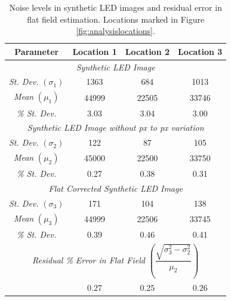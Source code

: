 \documentclass[11pt,a4paper]{article}
\begin{document}
	\begin{table}
		\centering
		\begin{tabular}{|c|c|c|c|}
			\hline
			\textbf{Parameter} &\textbf{ Location 1 }&\textbf{ Location 2} & \textbf{Location 3} \\ 
			\hline
			\hline 
			\multicolumn{4}{|c|}{\textit{Synthetic LED Image}} \\ 
			\hline
			\hline 
			\textit{St. Dev.} $(\sigma_1)$ &1363  & 684 & 1013 \\ 
			\hline 
			\textit{Mean }$(\mu_1)$& 44999 & 22505 & 33746 \\ 
			\hline 
			\textit{\% St. Dev.} &3.03  & 3.04 & 3.00 \\ 
			\hline 
			\hline
			\multicolumn{4}{|c|}{\textit{Synthetic LED Image without px to px variation}} \\ 
			\hline
			\hline 
			\textit{St. Dev.} $(\sigma_2)$&122  & 87 & 105 \\ 
			\hline 
			\textit{Mean} $(\mu_2)$& 45000 & 22500 & 33750 \\ 
			\hline 
			\textit{\% St. Dev.}& 0.27 & 0.38 & 0.31 \\ 
			\hline 
			\hline
			\multicolumn{4}{|c|}{\textit{Flat Corrected Synthetic LED Image}} \\ 
			\hline
			\hline 
			\textit{St. Dev. }$(\sigma_3)$& 171 & 104 & 138 \\ 
			\hline 
			\textit{Mean} $(\mu_3)$& 44999 & 22506 & 33745 \\ 
			\hline 
			\textit{\% St. Dev.}& 0.39 & 0.46 & 0.41 \\ 
			\hline 
			\hline
			\multicolumn{4}{|c|}{\textit{Residual \% Error in Flat Field} $\left(\dfrac{\sqrt{\sigma_3^2-\sigma_2^2}}{\mu_2}\right)$} \\
			\hline
			\hline
			& 0.27 & 0.25 & 0.26 \\ 
			\hline
		\end{tabular} 
		\caption{Noise levels in synthetic LED images and residual error in flat field estimation. Locations marked in Figure \ref{fig:analysislocations}. }
		\label{table:compare}
	\end{table}
\end{document}
